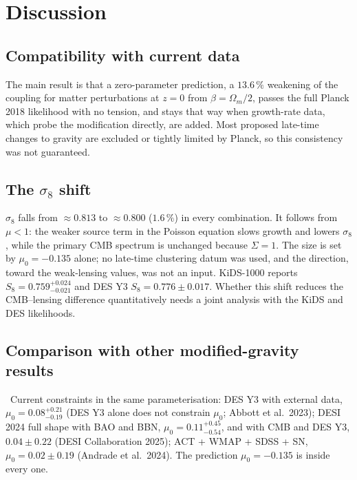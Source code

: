 \section{Discussion}
\subsection{Compatibility with current data}
The main result is that a zero-parameter prediction, a $13.6\,\%$ weakening of the coupling for matter perturbations at $z=0$ from $\beta=\Omega_m/2$,
passes the full Planck 2018 likelihood with no tension, and stays that way when growth-rate data, which probe the modification directly, are added. Most proposed
late-time changes to gravity are excluded or tightly limited by Planck, so this consistency was not guaranteed.

\subsection{The $\sigma_8$ shift}
$\sigma_8$ falls from $\approx0.813$ to $\approx0.800$ ($1.6\,\%$) in every combination. It follows from $\mu<1$: the weaker source term in the Poisson equation slows
growth and lowers $\sigma_8$, while the primary CMB spectrum is unchanged because $\Sigma=1$. The size is set by $\mu_0=-0.135$ alone; no late-time clustering datum
was used, and the direction, toward the weak-lensing values, was not an input. KiDS-1000 reports $S_8=0.759^{+0.024}_{-0.021}$ and DES Y3 $S_8=0.776\pm0.017$.
Whether this shift reduces the CMB--lensing difference quantitatively needs a joint analysis with the KiDS and DES likelihoods.

\subsection{Comparison with other modified-gravity results}
\observed\ Current constraints in the same parameterisation: DES Y3 with external data, $\mu_0=0.08^{+0.21}_{-0.19}$ (DES Y3 alone does not constrain $\mu_0$;
Abbott et al.\ 2023); DESI 2024 full shape with BAO and BBN, $\mu_0=0.11^{+0.45}_{-0.54}$, and with CMB and DES Y3, $0.04\pm0.22$ (DESI Collaboration 2025);
ACT + WMAP + SDSS + SN, $\mu_0=0.02\pm0.19$ (Andrade et al.\ 2024). The prediction $\mu_0=-0.135$ is inside every one.

